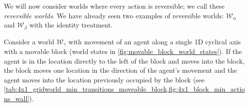 
We will now consider worlds where every action is reversible; we call these \emph{reversible worlds}.
We have already seen two examples of reversible worlds: $\mathscr{W}_{\alpha}$ and $\mathscr{W}_{\beta}$ with the identity treatment.

Consider a world $\mathscr{W}_{\gamma}$ with movement of an agent along a single 1D cyclical axis with a movable block (world states in \cref{fig:movable_block_world_states}).
If the agent is in the location directly to the left of the block and moves into the block, the block moves one location in the direction of the agent's movement and the agent moves into the location previously occupied by the block (see \cref{tab:4x1_gridworld_min_transitions_moveable_block,fig:4x1_block_min_actions_wall}).


